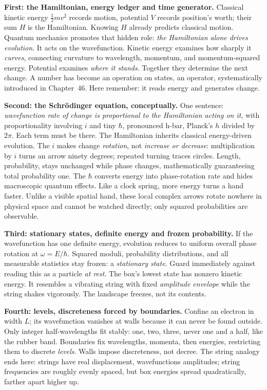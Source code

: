 \begin{mainline}
\textbf{First: the Hamiltonian, energy ledger and time generator.} Classical kinetic energy \(\tfrac12 mv^{2}\) records motion, potential \(V\) records position's worth; their sum \(H\) is the Hamiltonian. Knowing \(H\) already predicts classical motion. Quantum mechanics promotes that hidden role: \emph{the Hamiltonian alone drives evolution}. It acts on the wavefunction. Kinetic energy examines how sharply it \emph{curves}, connecting curvature to wavelength, momentum, and momentum-squared energy. Potential examines \emph{where it stands}. Together they determine the next change. A number has become an operation on states, an operator, systematically introduced in Chapter~46. Here remember: it reads energy and generates change.

\textbf{Second: the Schrödinger equation, conceptually.} One sentence: \emph{wavefunction rate of change is proportional to the Hamiltonian acting on it}, with proportionality involving \(i\) and tiny \(\hbar\), pronounced h-bar, Planck's \(h\) divided by \(2\pi\). Each term must be there. The Hamiltonian inherits classical energy-driven evolution. The \(i\) makes change \emph{rotation}, not \emph{increase or decrease}: multiplication by \(i\) turns an arrow ninety degrees; repeated turning traces circles. Length, probability, stays unchanged while phase changes, mathematically guaranteeing total probability one. The \(\hbar\) converts energy into phase-rotation rate and hides macroscopic quantum effects. Like a clock spring, more energy turns a hand faster. Unlike a visible spatial hand, these local complex arrows rotate nowhere in physical space and cannot be watched directly; only squared probabilities are observable.

\textbf{Third: stationary states, definite energy and frozen probability.} If the wavefunction has one definite energy, evolution reduces to uniform overall phase rotation at \(\omega=E/\hbar\). Squared moduli, probability distributions, and all measurable statistics stay frozen: a \emph{stationary state}. Guard immediately against reading this as a particle \emph{at rest}. The box's lowest state has nonzero kinetic energy. It resembles a vibrating string with fixed \emph{amplitude envelope} while the string shakes vigorously. The landscape freezes, not its contents.

\textbf{Fourth: levels, discreteness forced by boundaries.} Confine an electron in width \(L\); its wavefunction vanishes at walls because it can never be found outside. Only integer half-wavelengths fit stably: one, two, three, never one and a half, like the rubber band. Boundaries fix wavelengths, momenta, then energies, restricting them to discrete \emph{levels}. Walls impose discreteness, not decree. The string analogy ends here: strings have real displacement, wavefunctions amplitudes; string frequencies are roughly evenly spaced, but box energies spread quadratically, farther apart higher up.


\end{mainline}
